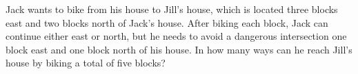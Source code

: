 Jack wants to bike from his house to Jill's house, which is located three blocks east and two blocks north of Jack's house. After biking each block, Jack can continue either east or north, but he needs to avoid a dangerous intersection one block east and one block north of his house. In how many ways can he reach Jill's house by biking a total of five blocks?
